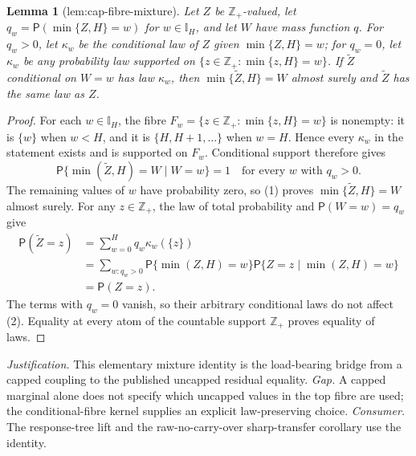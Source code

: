 \documentclass{article}
\newtheorem{lemma}{Lemma}
\begin{document}
\begin{lemma}[lem:cap-fibre-mixture]\label{lem:cap-fibre-mixture}
Let \(Z\) be \(\mathbb Z_+\)-valued, let \(q_w=\mathsf P(\min\{Z,H\}=w)\) for \(w\in\mathbb I_H\), and let \(W\) have mass function \(q\). For \(q_w>0\), let \(\kappa_w\) be the conditional law of \(Z\) given \(\min\{Z,H\}=w\); for \(q_w=0\), let \(\kappa_w\) be any probability law supported on \(\{z\in\mathbb Z_+:\min\{z,H\}=w\}\). If \(\widetilde Z\) conditional on \(W=w\) has law \(\kappa_w\), then \(\min\{\widetilde Z,H\}=W\) almost surely and \(\widetilde Z\) has the same law as \(Z\).
\end{lemma}
\begin{proof}
For each \(w\in\mathbb I_H\), the fibre \(F_w=\{z\in\mathbb Z_+:\min\{z,H\}=w\}\) is nonempty: it is \(\{w\}\) when \(w<H\), and it is \(\{H,H+1,\ldots\}\) when \(w=H\). Hence every \(\kappa_w\) in the statement exists and is supported on \(F_w\). Conditional support therefore gives
\[
 \mathsf P\{\min(\widetilde Z,H)=W\mid W=w\}=1
 \quad\text{for every }w\text{ with }q_w>0.               \tag{1}
\]
The remaining values of \(w\) have probability zero, so (1) proves \(\min\{\widetilde Z,H\}=W\) almost surely. For any \(z\in\mathbb Z_+\), the law of total probability and \(\mathsf P(W=w)=q_w\) give
\[
 \begin{aligned}
 \mathsf P(\widetilde Z=z)
 &=\sum_{w=0}^{H}q_w\kappa_w(\{z\})\\
 &=\sum_{w:q_w>0}\mathsf P\{\min(Z,H)=w\}
      \mathsf P\{Z=z\mid\min(Z,H)=w\}\\
 &=\mathsf P(Z=z).
 \end{aligned}                                           \tag{2}
\]
The terms with \(q_w=0\) vanish, so their arbitrary conditional laws do not affect (2). Equality at every atom of the countable support \(\mathbb Z_+\) proves equality of laws.
\end{proof}
\par\smallskip\noindent \textit{Justification.} This elementary mixture identity is the load-bearing bridge from a capped coupling to the published uncapped residual equality. \textit{Gap.} A capped marginal alone does not specify which uncapped values in the top fibre are used; the conditional-fibre kernel supplies an explicit law-preserving choice. \textit{Consumer.} The response-tree lift and the raw-no-carry-over sharp-transfer corollary use the identity.
\end{document}
